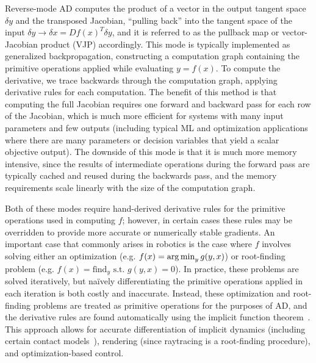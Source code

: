 Reverse-mode AD computes the product of a vector in the output tangent space $\delta y$ and the transposed Jacobian, ``pulling back'' into the tangent space of the input $\delta y \rightarrow \delta x = Df(x)^T \delta y$, and it is referred to as the pullback map or vector-Jacobian product (VJP) accordingly. This mode is typically implemented as generalized backpropagation, constructing a computation graph containing the primitive operations applied while evaluating $y = f(x)$. To compute the derivative, we trace backwards through the computation graph, applying derivative rules for each computation. The benefit of this method is that computing the full Jacobian requires one forward and backward pass for each row of the Jacobian, which is much more efficient for systems with many input parameters and few outputs (including typical ML and optimization applications where there are many parameters or decision variables that yield a scalar objective output). The downside of this mode is that it is much more memory intensive, since the results of intermediate operations during the forward pass are typically cached and reused during the backwards pass, and the memory requirements scale linearly with the size of the computation graph.

Both of these modes require hand-derived derivative rules for the primitive operations used in computing $f$; however, in certain cases these rules may be overridden to provide more accurate or numerically stable gradients. An important case that commonly arises in robotics is the case where $f$ involves solving either an optimization (e.g. $f(x) = \operatorname*{arg\,min}_y g(y, x)$) or root-finding problem (e.g. $f(x) = \text{find}_y \text{ s.t. } g(y, x) = 0$). In practice, these problems are solved iteratively, but na\"ively differentiating the primitive operations applied in each iteration is both costly and inaccurate. Instead, these optimization and root-finding problems are treated as primitive operations for the purposes of AD, and the derivative rules are found automatically using the implicit function theorem~\cite{agrawalDifferentiableConvexOptimization2019}. This approach allows for accurate differentiation of implicit dynamics (including certain contact models~\cite{howelllecleach2022}), rendering (since raytracing is a root-finding procedure), and optimization-based control.

